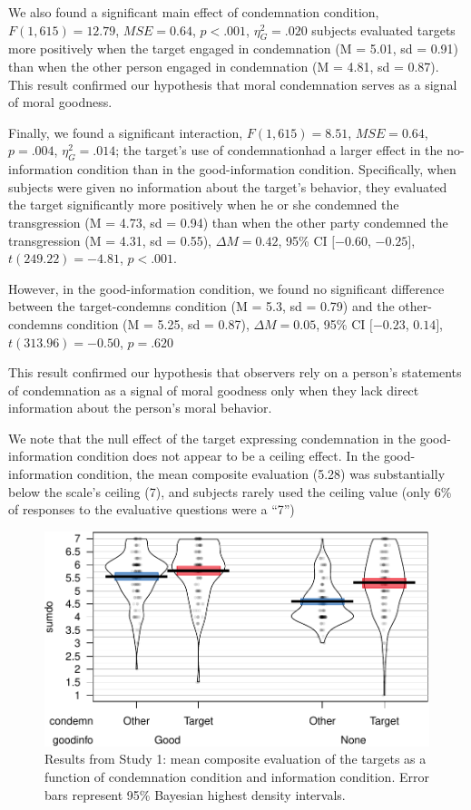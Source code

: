 \documentclass[english,pub]{apa6}
\theoremstyle{definition}
\theoremstyle{definition}
\theoremstyle{remark}
\begin{document}
We also found a significant main effect of condemnation condition,
\(F(1, 615) = 12.79\), \(\mathit{MSE} = 0.64\), \(p < .001\),
\(\eta^2_G = .020\) subjects evaluated targets more positively when the
target engaged in condemnation (M = 5.01, sd = 0.91) than when the other
person engaged in condemnation (M = 4.81, sd = 0.87). This result
confirmed our hypothesis that moral condemnation serves as a signal of
moral goodness.

Finally, we found a significant interaction, \(F(1, 615) = 8.51\),
\(\mathit{MSE} = 0.64\), \(p = .004\), \(\eta^2_G = .014\); the target's
use of condemnationhad a larger effect in the no-information condition
than in the good-information condition. Specifically, when subjects were
given no information about the target's behavior, they evaluated the
target significantly more positively when he or she condemned the
transgression (M = 4.73, sd = 0.94) than when the other party condemned
the transgression (M = 4.31, sd = 0.55), \(\Delta M = 0.42\), 95\% CI
\([-0.60\), \(-0.25]\), \(t(249.22) = -4.81\), \(p < .001\).

However, in the good-information condition, we found no significant
difference between the target-condemns condition (M = 5.3, sd = 0.79)
and the other-condemns condition (M = 5.25, sd = 0.87),
\(\Delta M = 0.05\), 95\% CI \([-0.23\), \(0.14]\),
\(t(313.96) = -0.50\), \(p = .620\)

This result confirmed our hypothesis that observers rely on a person's
statements of condemnation as a signal of moral goodness only when they
lack direct information about the person's moral behavior.

We note that the null effect of the target expressing condemnation in
the good-information condition does not appear to be a ceiling effect.
In the good-information condition, the mean composite evaluation (5.28)
was substantially below the scale's ceiling (7), and subjects rarely
used the ceiling value (only 6\% of responses to the evaluative
questions were a \enquote{7})

\begin{figure}[htbp]
\centering
\includegraphics{jordan_apa_files/figure-latex/figure1-1.pdf}
\caption{\label{fig:figure1}Results from Study 1: mean composite evaluation
of the targets as a function of condemnation condition and information
condition. Error bars represent 95\% Bayesian highest density
intervals.}
\end{figure}
\end{document}
